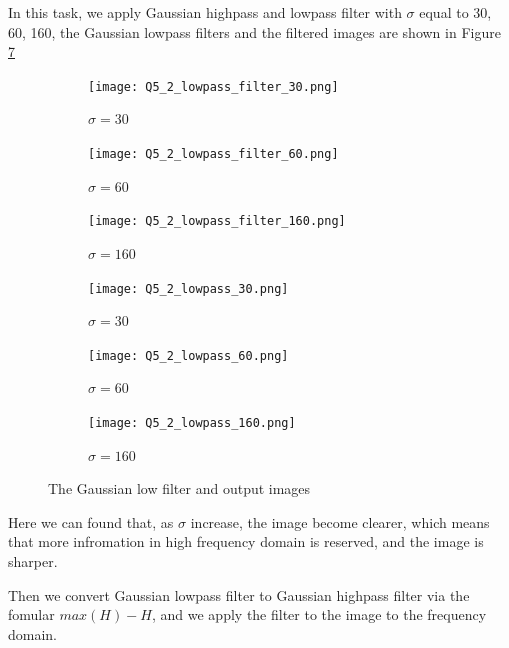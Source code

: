 \documentclass[
	12pt, %
]{style/fphw}
\begin{document}
In this task, we apply Gaussian highpass and lowpass filter with $\sigma$ equal to 30, 60, 160, the Gaussian lowpass filters and the filtered images are shown in Figure \ref{Gaussian low filter}

\begin{figure}[H]
    \centering
     \begin{subfigure}[b]{.3\textwidth}
         \centering
         \texttt{[image: Q5\_2\_lowpass\_filter\_30.png]}
         \caption{$\sigma=30$}
         \label{Q5_2_lowpass_filter_30}
     \end{subfigure}
     \hfill
     \begin{subfigure}[b]{.3\textwidth}
         \centering
         \texttt{[image: Q5\_2\_lowpass\_filter\_60.png]}
         \caption{$\sigma=60$}
         \label{Q5_2_lowpass_filter_60}
     \end{subfigure}
     \hfill
     \begin{subfigure}[b]{.3\textwidth}
         \centering
         \texttt{[image: Q5\_2\_lowpass\_filter\_160.png]}
         \caption{$\sigma=160$}
         \label{Q5_2_lowpass_filter_160}
     \end{subfigure}
     \vfill
     \begin{subfigure}[b]{.3\textwidth}
         \centering
         \texttt{[image: Q5\_2\_lowpass\_30.png]}
         \caption{$\sigma=30$}
         \label{Q5_2_lowpass_30}
     \end{subfigure}
     \hfill
     \begin{subfigure}[b]{.3\textwidth}
         \centering
         \texttt{[image: Q5\_2\_lowpass\_60.png]}
         \caption{$\sigma=60$}
         \label{Q5_2_lowpass_60}
     \end{subfigure}
     \hfill
     \begin{subfigure}[b]{.3\textwidth}
         \centering
         \texttt{[image: Q5\_2\_lowpass\_160.png]}
         \caption{$\sigma=160$}
         \label{Q5_2_lowpass_160}
     \end{subfigure}
     
    \caption{The Gaussian low filter and output images}
    \label{Gaussian low filter}
\end{figure}

Here we can found that, as $\sigma$ increase, the image become clearer, which means that more infromation in high frequency domain is reserved, and the image is sharper.

Then we convert Gaussian lowpass filter to Gaussian highpass filter via the fomular $max(H)-H$, and we apply the filter to the image to the frequency domain.
\end{document}
